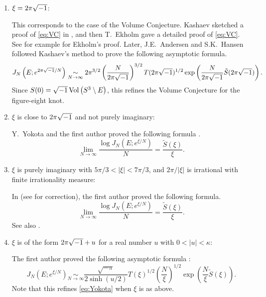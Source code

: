 \begin{enumerate}
\item
$\xi=2\pi\sqrt{-1}$:
\par
This corresponds to the case of the Volume Conjecture.
Kashaev sketched a proof of \eqref{eq:VC} in \cite{Kashaev:LETMP97}, and then T.~Ekholm gave a detailed proof of \eqref{eq:VC}.
See for example \cite[Section~3.2]{Murakami/Yokota:2018} for Ekholm's proof.
Later, J.E.~Andersen and S.K.~Hansen \cite[Theorem~1]{Andersen/Hansen:JKNOT2006} followed Kashaev's method to prove the following asymptotic formula.
\begin{equation*}
  J_{N}\left(E;e^{2\pi\sqrt{-1}/N}\right)
  \underset{N\to\infty}{\sim}
  2\pi^{3/2}\left(\frac{N}{2\pi\sqrt{-1}}\right)^{3/2}T(2\pi\sqrt{-1})^{1/2}
  \exp\left(\frac{N}{2\pi\sqrt{-1}}\tilde{S}(2\pi\sqrt{-1})\right).
\end{equation*}
Since $S(0)=\sqrt{-1}\operatorname{Vol}\left(S^3\setminus{E}\right)$, this refines the Volume Conjecture for the figure-eight knot.
\item
$\xi$ is close to $2\pi\sqrt{-1}$ and not purely imaginary:
\par
Y.~Yokota and the first author proved the following formula \cite{Murakami/Yokota:JREIA2007}.
\begin{equation}\label{eq:Yokota}
  \lim_{N\to\infty}
  \frac{\log J_{N}(E;e^{\xi/N})}{N}
  =
  \frac{\tilde{S}(\xi)}{\xi}.
\end{equation}
\item
$\xi$ is purely imaginary with $5\pi/3<|\xi|<7\pi/3$, and $2\pi/|\xi|$ is irrational with finite irrationality measure:
\par
In \cite{Murakami:KYUMJ2004} (see \cite{Murakami:KYUMJ2016} for correction), the first author proved the following formula.
\begin{equation*}
  \lim_{N\to\infty}
  \frac{\log J_{N}(E;e^{\xi/N})}{N}
  =
  \frac{\tilde{S}(\xi)}{\xi}.
\end{equation*}
See also \cite[6.2.2]{Murakami:Novosibirsk}.
\item
$\xi$ is of the form $2\pi\sqrt{-1}+u$ for a real number $u$ with $0<|u|<\kappa$:
\par
The first author proved the following asymptotic formula \cite[Theorem~1.4]{Murakami:JTOP2013}:
\begin{equation}\label{eq:J_top}
  J_{N}\left(E;e^{\xi/N}\right)
  \underset{N\to\infty}{\sim}
  \frac{\sqrt{-\pi}}{2\sinh(u/2)}T(\xi)^{1/2}\left(\frac{N}{\xi}\right)^{1/2}
  \exp\left(\frac{N}{\xi}\tilde{S}(\xi)\right).
\end{equation}
Note that this refines \eqref{eq:Yokota} when $\xi$ is as above.

\end{enumerate}
